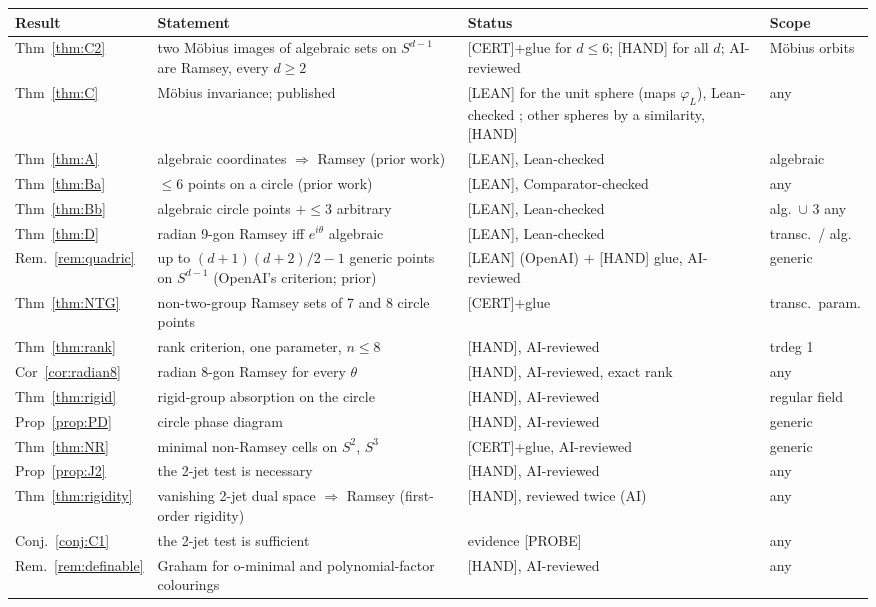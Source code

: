 \documentclass[11pt]{amsart}
\newcommand{\st}[1]{\textsf{[#1]}}
\theoremstyle{plain}
\theoremstyle{definition}
\begin{document}
\medskip
{\small
\noindent\begin{tabular}{@{}p{}p{}p{}p{}@{}}
\toprule
Result & Statement & Status & Scope \\
\midrule
Thm~\ref{thm:C2} & two M\"obius images of algebraic sets on $S^{d-1}$ are Ramsey, every $d\ge2$
 & \st{CERT}+glue for $d\le6$; \st{HAND} for all $d$; AI-reviewed & M\"obius orbits \\
Thm~\ref{thm:C} & M\"obius invariance; published \cite{MR} & \st{LEAN} for the unit sphere (maps $\varphi_L$), Lean-checked \cite{MR}; other spheres by a similarity, \st{HAND} & any \\
Thm~\ref{thm:A} & algebraic coordinates $\Rightarrow$ Ramsey (prior work) & \st{LEAN}, Lean-checked & algebraic \\
Thm~\ref{thm:Ba} & $\le6$ points on a circle (prior work) & \st{LEAN}, Comparator-checked & any \\
Thm~\ref{thm:Bb} & algebraic circle points $+\le3$ arbitrary & \st{LEAN}, Lean-checked & alg.\ $\cup$ 3 any \\
Thm~\ref{thm:D} & radian 9-gon Ramsey iff $e^{i\theta}$ algebraic & \st{LEAN}, Lean-checked & transc.\ / alg. \\
Rem.~\ref{rem:quadric} & up to $(d+1)(d+2)/2-1$ generic points on $S^{d-1}$ (OpenAI's criterion; prior) & \st{LEAN} (OpenAI) + \st{HAND} glue, AI-reviewed & generic \\
Thm~\ref{thm:NTG} & non-two-group Ramsey sets of 7 and 8 circle points & \st{CERT}+glue & transc.\ param. \\
Thm~\ref{thm:rank} & rank criterion, one parameter, $n\le8$ & \st{HAND}, AI-reviewed & trdeg 1 \\
Cor~\ref{cor:radian8} & radian 8-gon Ramsey for every $\theta$ & \st{HAND}, AI-reviewed, exact rank & any \\
Thm~\ref{thm:rigid} & rigid-group absorption on the circle & \st{HAND}, AI-reviewed & regular field \\
Prop~\ref{prop:PD} & circle phase diagram & \st{HAND}, AI-reviewed & generic \\
Thm~\ref{thm:NR} & minimal non-Ramsey cells on $S^2$, $S^3$ & \st{CERT}+glue, AI-reviewed & generic \\
Prop~\ref{prop:J2} & the 2-jet test is necessary & \st{HAND}, AI-reviewed & any \\
Thm~\ref{thm:rigidity} & vanishing 2-jet dual space $\Rightarrow$ Ramsey (first-order rigidity) & \st{HAND}, reviewed twice (AI) & any \\
Conj.~\ref{conj:C1} & the 2-jet test is sufficient & evidence \st{PROBE} & any \\
Rem.~\ref{rem:definable} & Graham for o-minimal and polynomial-factor colourings & \st{HAND}, AI-reviewed & any \\
\bottomrule
\end{tabular}}
\end{document}
